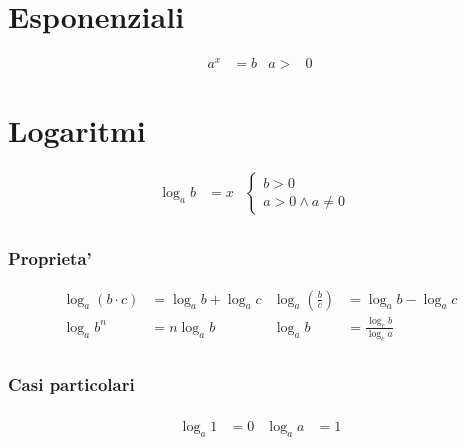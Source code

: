 \documentclass[a4paper]{article}
\begin{document}
	\newpage
	\section{Esponenziali}
	\begin{align*}
		a^x &= b		&		a>&0
	\end{align*}
		
			\begin{center}
		\end{center}
		
	\section{Logaritmi}
	\begin{align*}
		\log_{a}{b} &= x
		&
		\begin{cases}
		b > 0\\
		a > 0 \wedge a \ne 0
		\end{cases}&\\
	\end{align*}
	
	\subsubsection{Proprieta'}
	\begin{align*}
		\log_{a}(b \cdot c)                 & = \log_{a} b + \log_{a} c &
		\log_{a} \left( \frac{b}{c} \right) & = \log_{a} b - \log_{a} c \\
		\log_{a} b^n                        & = n \log_{a} b		&
		\log_{a} b 							& = \frac{\log_{c} b}{\log_{c} a}\\
	\end{align*}
	\subsubsection{Casi particolari}
	\begin{align*}
		\\ \log_{a} 1 &= 0 &
		\log_{a} a &= 1
	\end{align*}
		
\end{document}
